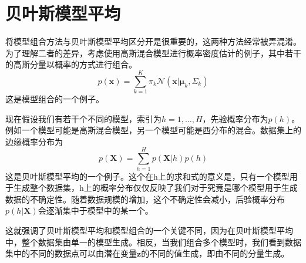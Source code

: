 \section{贝叶斯模型平均}
将模型组合方法与贝叶斯模型平均区分开是很重要的，这两种方法经常被弄混淆。为了理解二者的差异，考虑使用高斯混合模型进行概率密度估计的例子，其中若干的高斯分量以概率的方式进行组合。
\begin{equation}
	p(\boldsymbol{x})=\sum_{k=1}^{K}\pi_k\mathcal{N}(\boldsymbol{x}|\boldsymbol{\mu}_k,\Sigma_k)
\end{equation}
这是模型组合的一个例子。

现在假设我们有若干个不同的模型，索引为$h=1,\dots,H$，先验概率分布为$p(h)$。例如一个模型可能是高斯混合模型，另一个模型可能是西分布的混合。数据集上的边缘概率分布为
\begin{equation}
	p(\boldsymbol{X})=\sum_{h=1}^{H}p(\boldsymbol{X}|h)p(h)
\end{equation}
这是贝叶斯模型平均的一个例子。这个在h上的求和式的意义是，只有一个模型用于生成整个数据集，h上的概率分布仅仅反映了我们对于究竟是哪个模型用于生成数据的不确定性。随着数据规模的增加，这个不确定性会减小，后验概率分布$p(h|\boldsymbol{X})$会逐渐集中于模型中的某一个。

这就强调了贝叶斯模型平均和模型组合的一个关键不同，因为在贝叶斯模型平均中，整个数据集由单一的模型生成。相反，当我们组合多个模型时，我们看到数据集中的不同的数据点可以由潜在变量$\boldsymbol{z}$的不同的值生成，即由不同的分量生成。